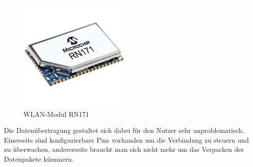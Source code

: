     \begin{figure}[tbh]
      \begin{centering}
        \includegraphics[width = 0.5\textwidth]{Bilder/RN171}
      \par\end{centering}
      \caption[WLAN-Modul RN171]{WLAN-Modul RN171\cite{RN171}}
      \label{RN171}
    \end{figure}

    Die Datenübertragung gestaltet sich dabei für den Nutzer sehr unproblematisch. Einerseits sind konfigurierbare Pins vorhanden um die Verbindung zu steuern und zu überwachen,
    andererseits braucht man sich nicht mehr um das Verpacken der Datenpakete kümmern.

